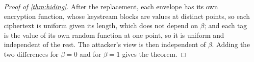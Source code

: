 \begin{proof}[Proof of \cref{thm:hiding}]
After the replacement, each envelope has its own encryption function, whose keystream blocks are values at distinct points, so each ciphertext is uniform given its length, which does not depend on $\beta$; and each tag is the value of its own random function at one point, so it is uniform and independent of the rest. The attacker's view is then independent of $\beta$. Adding the two differences for $\beta = 0$ and for $\beta = 1$ gives the theorem.
\end{proof}

